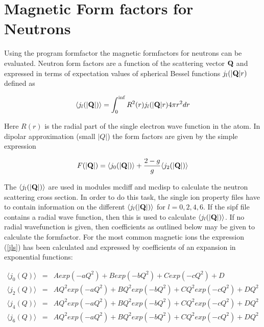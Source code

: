 \section{Magnetic Form factors for Neutrons}\label{ffacts}

Using the program {\prg formfactor} the magnetic formfactors for neutrons
can be evaluated.
Neutron form factors are a function of the scattering vector
$\mathbf Q$ and expressed in terms of expectation values
of spherical Bessel functions $j_l(|\mathbf Q|r)$ defined as 

\begin{equation}\label{jls}
\langle j_l(|\mathbf Q|) \rangle=\int_0^{\inf} R^2(r) j_l(|\mathbf Q|r) 4\pi r^2 dr
\end{equation}

Here $R(r)$ is the radial part of the single electron wave function in the
atom. In dipolar approximation (small $|Q|$) the form factors are given
by the simple expression

\begin{equation}
F(|\mathbf Q|)=\langle j_0(|\mathbf Q|) \rangle + \frac{2-g}{g}\langle j_2(|\mathbf Q|) \rangle  
\end{equation}

The $\langle j_l(|\mathbf Q|) \rangle$ are used in modules {\prg mcdiff} and {\prg mcdisp} 
to calculate the neutron
scattering cross section. In order to do this task, the single ion property files have
 to contain information on the different $\langle j_l(|\mathbf Q|) \rangle$ for
 $l=0,2,4,6$. If the sipf file contains a radial wave function, then this is used to
calculate $\langle j_l(|\mathbf Q|) \rangle$. If no radial wavefunction is given, then
 coefficients as outlined below may be given to calculate the formfactor.
 For the most common magnetic ions the expression (\ref{jls}) has been calculated
 and expressed by coefficients of an expansion in exponential functions:
 
\begin{eqnarray}
\langle j_0(Q) \rangle&=&A exp(-aQ^2)+B exp(-bQ^2)+C exp(-cQ^2)+D \\
\langle j_2(Q) \rangle&=&A Q^2 exp(-aQ^2)+B Q^2 exp(-bQ^2)+C Q^2 exp(-cQ^2)+D Q^2 \\
\langle j_4(Q) \rangle&=&A Q^2 exp(-aQ^2)+B Q^2 exp(-bQ^2)+C Q^2 exp(-cQ^2)+D Q^2 \\
\langle j_6(Q) \rangle&=&A Q^2 exp(-aQ^2)+B Q^2 exp(-bQ^2)+C Q^2 exp(-cQ^2)+D Q^2 
\end{eqnarray}
 

